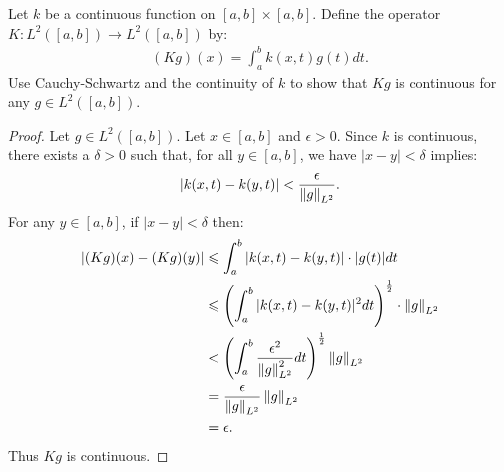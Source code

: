 \documentclass[10pt,oneside,openany]{memoir}
\begin{document}
\newpage
\begin{exercise}[manual-num={6}]
Let $k$ be a continuous function on $[a,b] \times [a,b]$. Define the operator $K:L^2([a,b]) \rightarrow L^2([a,b])$ by:
    \begin{equation*}
    \begin{split}
        (Kg)(x) = \int_a^b k(x,t)g(t)dt.
    \end{split}
    \end{equation*}
Use Cauchy-Schwartz and the continuity of $k$ to show that $Kg$ is continuous for any $g \in L^2([a,b])$.
\end{exercise}
    \begin{proof}
        Let $g \in L^2([a,b])$. Let $x \in [a,b]$ and $\epsilon > 0$. Since $k$ is continuous, there exists a $\delta > 0$ such that, for all $y \in [a,b]$, we have $|x-y| < \delta$ implies:
            \begin{equation*}
            \begin{split}
                |k(x,t) - k(y,t)| < \frac{\epsilon}{\left\lVert g \right\rVert_{L^2}}.
            \end{split}
            \end{equation*}
        For any $y \in [a,b]$, if $|x-y| < \delta$ then:
            \begin{equation*}
            \begin{split}
                |(Kg)(x) - (Kg)(y)| 
                & \leqslant \int_a^b |k(x,t) - k(y,t)|\cdot|g(t)|dt \\
                & \leqslant \left( \int_a^b |k(x,t) - k(y,t)|^2dt \right)^\frac{1}{2}\cdot \left\lVert g \right\rVert_{L^2} \\
                & < \left( \int_a^b \frac{\epsilon^2}{\left\lVert g \right\rVert_{L^2}^2} dt \right)^\frac{1}{2}\left\lVert g \right\rVert_{L^2} \\
                & = \frac{\epsilon}{\left\lVert g \right\rVert_{L^2}} \left\lVert g \right\rVert_{L^2} \\
                & = \epsilon.
            \end{split}
            \end{equation*}
        Thus $Kg$ is continuous.
    \end{proof}
\end{document}
